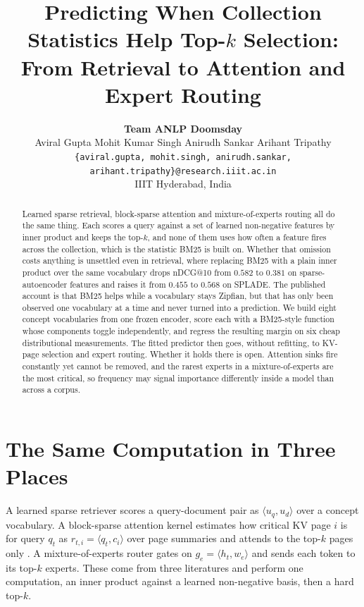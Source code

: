 \documentclass[11pt]{article}
\title{Predicting When Collection Statistics Help Top-$k$ Selection:\\
From Retrieval to Attention and Expert Routing}
\author{
  \textbf{Team ANLP Doomsday} \\[2pt]
  Aviral Gupta \quad Mohit Kumar Singh \quad Anirudh Sankar \quad Arihant Tripathy \\
  \texttt{\{aviral.gupta, mohit.singh, anirudh.sankar, arihant.tripathy\}@research.iiit.ac.in} \\
  IIIT Hyderabad, India
}
\begin{document}
\maketitle

\begin{abstract}
Learned sparse retrieval, block-sparse attention and mixture-of-experts routing
all do the same thing. Each scores a query against a set of learned non-negative
features by inner product and keeps the top-$k$, and none of them uses how often
a feature fires across the collection, which is the statistic BM25 is built on.
Whether that omission costs anything is unsettled even in retrieval, where
replacing BM25 with a plain inner product over the same vocabulary drops nDCG@10
from $0.582$ to $0.381$ on sparse-autoencoder features and raises it from $0.455$
to $0.568$ on SPLADE. The published account is that BM25 helps while a vocabulary
stays Zipfian, but that has only been observed one vocabulary at a time and never
turned into a prediction. We build eight concept vocabularies from one frozen
encoder, score each with a BM25-style function whose components toggle
independently, and regress the resulting margin on six
cheap distributional measurements. The fitted predictor then goes, without refitting, to KV-page
selection and expert routing. Whether it holds there is open. Attention sinks
fire constantly yet cannot be removed, and the rarest experts in a
mixture-of-experts are the most critical, so frequency may signal importance
differently inside a model than across a corpus.
\end{abstract}

\section{The Same Computation in Three Places}

A learned sparse retriever scores a query-document pair as
$\langle u_q, u_d \rangle$ over a concept vocabulary. A block-sparse attention
kernel estimates how critical KV page $i$ is for query $q_t$ as
$r_{t,i} = \langle q_t, c_i \rangle$ over page summaries and attends to the
top-$k$ pages only \citep{tang2024quest}. A mixture-of-experts router gates on
$g_e = \langle h_t, w_e \rangle$ and sends each token to its top-$k$ experts.
These come from three literatures and perform one computation, an inner product
against a learned non-negative basis, then a hard top-$k$.
\end{document}
